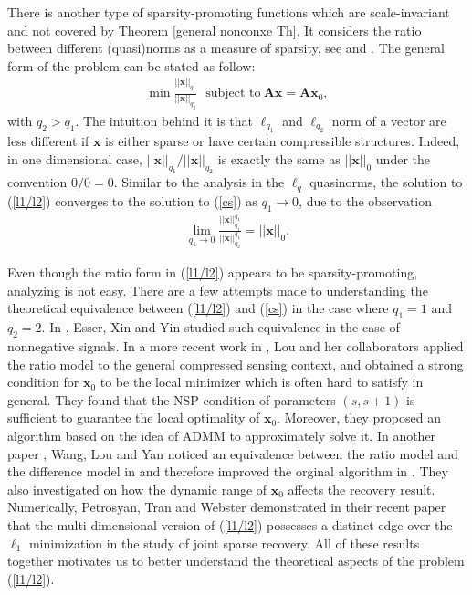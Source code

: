 \documentclass[11pt]{article}
\numberwithin{equation}{section}
\theoremstyle{plain}
\theoremstyle{definition}
\def\A{{\mathbf A}}
\def\x{{\mathbf x}}
\begin{document}
There is another type of sparsity-promoting functions which are scale-invariant and not covered by Theorem \ref{general nonconxe Th}. It considers the ratio between different (quasi)norms as a measure of sparsity, see \cite{hoyer2002non} and \cite{hurley2009comparing}. The general form of the problem can be stated as follow:
\begin{align}
\min \frac{||\x||_{q_1}}{||\x||_{q_2}} \ \ \ \text{subject to}\ \A\x=\A\x_0,\label{l1/l2}
\end{align}
with $q_2>q_1$. The intuition behind it is that $\ell_{q_1}$ and $\ell_{q_2}$ norm of a vector are less different if $\x$ is either sparse or have certain compressible structures. Indeed, in one dimensional case, $||\x||_{q_1}/||\x||_{q_2}$ is exactly the same as $||\x||_0$ under the convention $0/0=0$. Similar to the analysis in the $\ell_q$ quasinorms, the solution to (\ref{l1/l2}) converges to the solution to (\ref{cs}) as $q_1\rightarrow 0$, due to the observation
\begin{align*}
\lim_{q_1\rightarrow 0}\frac{||\x||^{q_1}_{q_1}}{||\x||^{q_1}_{q_2}}=||\x||_0.
\end{align*}

Even though the ratio form in (\ref{l1/l2}) appears to be sparsity-promoting, analyzing is not easy. There are a few attempts made to understanding the theoretical equivalence between (\ref{l1/l2}) and (\ref{cs}) in the case where $q_1=1$ and $q_2=2$. In \cite{yin2014ratio}, Esser, Xin and Yin studied such equivalence in the case of nonnegative signals. In a more recent work in \cite{rahimi2018scale}, Lou and her collaborators applied the ratio model to the general compressed sensing context, and obtained a strong condition for $\x_0$ to be the local minimizer which is often hard to satisfy in general. They found that the NSP condition of parameters $(s, s+1)$ is sufficient to guarantee the local optimality of $\x_0$. Moreover, they proposed an algorithm based on the idea of ADMM to approximately solve it. In another paper \cite{wang2019accelerated}, Wang, Lou and Yan noticed an equivalence between the ratio model and the difference model in \cite{yin2015minimization} and therefore improved the orginal algorithm in \cite{rahimi2018scale}. They also investigated on how the dynamic range of $\x_0$ affects the recovery result. Numerically, Petrosyan, Tran and Webster demonstrated in their recent paper \cite{petrosyan2019reconstruction} that the multi-dimensional version of (\ref{l1/l2}) possesses a distinct edge over the $\ell_1$ minimization in the study of joint sparse recovery. All of these results together motivates us to better understand the theoretical aspects of the problem (\ref{l1/l2}).  
\end{document}
